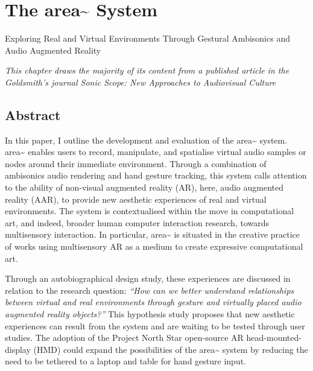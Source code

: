 \chapter{The area\textasciitilde{} System}{Exploring Real and Virtual Environments Through Gestural Ambisonics and Audio Augmented Reality}\label{sec: area}


\epigraph{\emph{This chapter draws the majority of its content from a published article in the Goldsmith's journal \textit{Sonic Scope: New Approaches to Audiovisual Culture}}}{\citep[]{bilbow2021a}}

\section{Abstract}                              \label{sec: area-abstract}
In this paper, I outline the development and evaluation of the area\textasciitilde{} system. area\textasciitilde{} enables users to record, manipulate, and spatialise virtual audio samples or nodes around their immediate environment. Through a combination of ambisonics audio rendering and hand gesture tracking, this system calls attention to the ability of non-visual augmented reality (AR), here, audio augmented reality (AAR), to provide new aesthetic experiences of real and virtual environments. The system is contextualised within the move in computational art, and indeed, broader human computer interaction research, towards multisensory interaction. In particular, area\textasciitilde{} is situated in the creative practice of works using multisensory AR as a medium to create expressive computational art.

Through an autobiographical design study, these experiences are discussed in relation to the research question: \textit{“How can we better understand relationships between virtual and real environments through gesture and virtually placed audio augmented reality objects?”} This hypothesis study proposes that new aesthetic experiences can result from the system and are waiting to be tested through user studies. The adoption of the Project North Star open-source AR head-mounted-display (HMD) could expand the possibilities of the area\textasciitilde{} system by reducing the need to be tethered to a laptop and table for hand gesture input.

